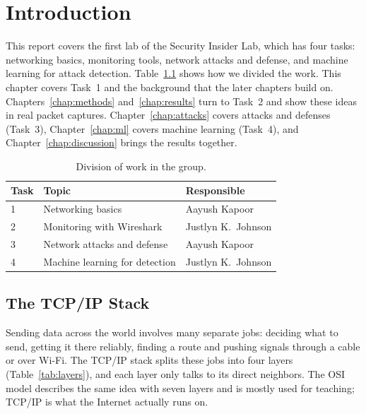 \chapter{Introduction}\label{chap:introduction}

This report covers the first lab of the Security Insider Lab, which has four tasks: networking basics, monitoring tools, network attacks and defense, and machine learning for attack detection. Table~\ref{tab:split} shows how we divided the work. This chapter covers Task~1 and the background that the later chapters build on. Chapters~\ref{chap:methods} and~\ref{chap:results} turn to Task~2 and show these ideas in real packet captures. Chapter~\ref{chap:attacks} covers attacks and defenses (Task~3), Chapter~\ref{chap:ml} covers machine learning (Task~4), and Chapter~\ref{chap:discussion} brings the results together.

\begin{table}[ht]
	\centering
	\begin{tabular}{@{}lll@{}}
		\toprule
		Task & Topic & Responsible \\
		\midrule
		1 & Networking basics & Aayush Kapoor \\
		2 & Monitoring with Wireshark & Justlyn K.\ Johnson \\
		3 & Network attacks and defense & Aayush Kapoor \\
		4 & Machine learning for detection & Justlyn K.\ Johnson \\
		\bottomrule
	\end{tabular}
	\caption{Division of work in the group.}
	\label{tab:split}
\end{table}

\section{The TCP/IP Stack}\label{sec:stack}

Sending data across the world involves many separate jobs: deciding what to send, getting it there reliably, finding a route and pushing signals through a cable or over Wi-Fi. The TCP/IP stack splits these jobs into four layers (Table~\ref{tab:layers}), and each layer only talks to its direct neighbors. The OSI model describes the same idea with seven layers and is mostly used for teaching; TCP/IP is what the Internet actually runs on.

